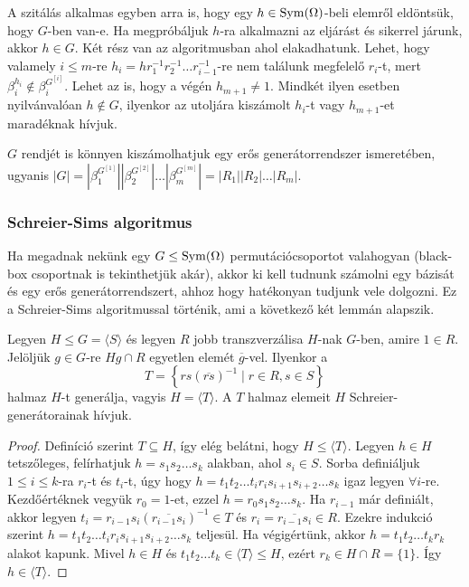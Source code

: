 A szitálás alkalmas egyben arra is, hogy egy $h \in \operatorname{Sym}(\Omega)$-beli elemről eldöntsük, hogy $G$-ben van-e.
Ha megpróbáljuk $h$-ra alkalmazni az eljárást és sikerrel járunk, akkor $h\in G$.
Két rész van az algoritmusban ahol elakadhatunk.
Lehet, hogy valamely $i \le m$-re $h_i = h r_1^{-1} r_2^{-1} \dots r_{i-1}^{-1}$-re nem találunk megfelelő $r_i$-t, mert $\beta_i^{h_i} \notin \beta_i^{G^{[i]}}$.
Lehet az is, hogy a végén $h_{m+1} \neq 1$.
Mindkét ilyen esetben nyilvánvalóan $h \notin G$, ilyenkor az utoljára kiszámolt $h_i$-t vagy $h_{m+1}$-et maradéknak hívjuk.

$G$ rendjét is könnyen kiszámolhatjuk egy erős generátorrendszer ismeretében, ugyanis $|G| = |\beta_1^{G^{[1]}}| |\beta_2^{G^{[2]}}| \dots |\beta_m^{G^{[m]}}| = |R_1| |R_2| \dots |R_m|$.

\subsubsection{Schreier-Sims algoritmus}
\label{subsubsec:permss}
Ha megadnak nekünk egy $G \le \operatorname{Sym}(\Omega)$ permutációcsoportot valahogyan (black-box csoportnak is tekinthetjük akár),
akkor ki kell tudnunk számolni egy bázisát és egy erős generátorrendszert, ahhoz hogy hatékonyan tudjunk vele dolgozni.
Ez a Schreier-Sims algoritmussal történik, ami a következő két lemmán alapszik.
\begin{lemma}[Schreier]
\label{thm:sims1}
Legyen $H \le G = \langle S \rangle$ és legyen $R$ jobb transzverzálisa $H$-nak $G$-ben, amire $1\in R$.
Jelöljük $g \in G$-re $Hg\cap R$ egyetlen elemét $\overline{g}$-vel.
Ilyenkor a
\begin{equation*}
T=\left\{ rs(\overline{rs})^{-1} \mid r\in R, s\in S \right\}
\end{equation*}
halmaz $H$-t generálja, vagyis $H=\langle T \rangle$. A $T$ halmaz elemeit $H$ Schreier-generátorainak hívjuk.
\end{lemma}
\begin{proof}
Definíció szerint $T \subseteq H$, így elég belátni, hogy $H \le \langle T \rangle$.
Legyen $h \in H$ tetszőleges, felírhatjuk $h = s_1 s_2 \dots s_k$ alakban, ahol $s_i \in S$.
Sorba definiáljuk $1 \le i \le k$-ra $r_i$-t és $t_i$-t, úgy hogy $h = t_1 t_2 \dots t_i r_i s_{i+1} s_{i+2} \dots s_k$ igaz legyen $\forall i$-re.
Kezdőértéknek vegyük $r_0=1$-et, ezzel $h = r_0 s_1 s_2 \dots s_k$.
Ha $r_{i-1}$ már definiált, akkor legyen $t_i=r_{i-1} s_i (\overline{r_{i-1} s_i})^{-1} \in T$ és $r_i = \overline{r_{i-1} s_i} \in R$.
Ezekre indukció szerint $h = t_1 t_2 \dots t_i r_i s_{i+1} s_{i+2} \dots s_k$ teljesül.
Ha végigértünk, akkor $h = t_1 t_2 \dots t_k r_k$ alakot kapunk.
Mivel $h \in H$ és $t_1 t_2 \dots t_k \in \langle T \rangle \le H$, ezért $r_k \in H\cap R = \{1\}$.
Így $h \in \langle T \rangle$.
\end{proof}
